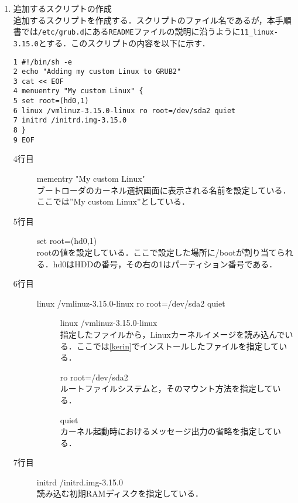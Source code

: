 \documentclass[12pt]{jsarticle}
\begin{document}
\begin{enumerate}
  \item 追加するスクリプトの作成\\
   追加するスクリプトを作成する．スクリプトのファイル名であるが，本手順書では\verb|/etc/grub.d|にある\verb|README|ファイルの説明に沿うように\verb|11_linux-3.15.0|とする．このスクリプトの内容を以下に示す．\\
    
\begin{verbatim}
1 #!/bin/sh -e
2 echo "Adding my custom Linux to GRUB2"
3 cat << EOF
4 menuentry "My custom Linux" {
5 set root=(hd0,1)
6 linux /vmlinuz-3.15.0-linux ro root=/dev/sda2 quiet
7 initrd /initrd.img-3.15.0
8 }
9 EOF
\end{verbatim}
\begin{description}
\item[4行目] mementry "My custom Linux"\\
ブートローダのカーネル選択画面に表示される名前を設定している．ここでは”My custom Linux”としている．
\item[5行目] set root=(hd0,1)\\
rootの値を設定している．ここで設定した場所に/bootが割り当てられる．hd0はHDDの番号，その右の1はパーティション番号である．
\item[6行目] linux /vmlinuz-3.15.0-linux ro root=/dev/sda2 quiet\\
  \begin{description}
  \item[] linux /vmlinuz-3.15.0-linux \\
    指定したファイルから，Linuxカーネルイメージを読み込んでいる．ここでは\ref{kerin}でインストールしたファイルを指定している．
  \item[] ro root=/dev/sda2 \\
    ルートファイルシステムと，そのマウント方法を指定している．
  \item[] quiet \\
    カーネル起動時におけるメッセージ出力の省略を指定している．
  \end{description}
\item[7行目] initrd /initrd.img-3.15.0　\\
  読み込む初期RAMディスクを指定している．
\end{description}


\end{enumerate}
\end{document}
